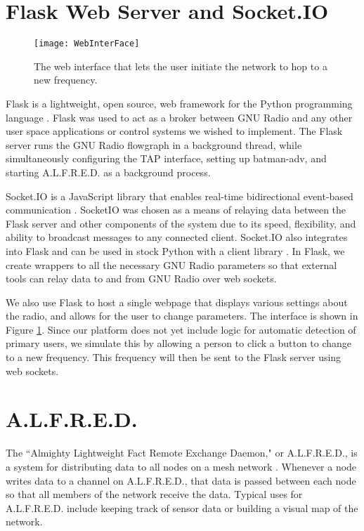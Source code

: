 \section{Flask Web Server and Socket.IO}

\begin{figure}
	\centering
	\texttt{[image: WebInterFace]}
	\caption{The web interface that lets the user initiate the network to hop to a new frequency. \cite{selfpaper}}
	\label{fig:WebInterface}
\end{figure}

Flask is a lightweight, open source, web framework for the Python programming language \cite{0011}. Flask was used to act as a broker between GNU Radio and any other user space applications or control systems we wished to implement. The Flask server runs the GNU Radio flowgraph in a background thread, while simultaneously configuring the TAP interface, setting up batman-adv, and starting A.L.F.R.E.D. as a background process. 

Socket.IO is a JavaScript library that enables real-time bidirectional event-based communication \cite{0012}.  SocketIO was chosen as a means of relaying data between the Flask server and other components of the system due to its speed, flexibility, and ability to broadcast messages to any connected client. Socket.IO also integrates into Flask \cite{0013} and can be used in stock Python with a client library \cite{0014}. In Flask, we create wrappers to all the necessary GNU Radio parameters so that external tools can relay data to and from GNU Radio over web sockets.  

We also use Flask to host a single webpage that displays various settings about the radio, and allows for the user to change parameters. The interface is shown in Figure \ref{fig:WebInterface}. Since our platform does not yet include logic for automatic detection of primary users, we simulate this by allowing a person to click a button to change to a new frequency. This frequency will then be sent to the Flask server using web sockets.  

\section{A.L.F.R.E.D.}

 The ``Almighty Lightweight Fact Remote Exchange Daemon," or A.L.F.R.E.D., is a system for distributing data to all nodes on a mesh network \cite{0015}. Whenever a node writes data to a channel on A.L.F.R.E.D., that data is passed between each node so that all members of the network receive the data. Typical uses for A.L.F.R.E.D. include keeping track of sensor data or building a visual map of the network. 

